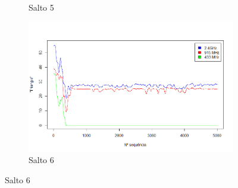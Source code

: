 \documentclass[
	12pt,				%
	openright,			%
	oneside,
	a4paper,			%
	english,			%
	french,				%
	spanish,			%
	brazil				%
	]{abntex2}
\begin{document}
\begin{figure}[htb]
\begin{subfigure}{.5\textwidth}
		\captionsetup{width=.9\textwidth}
		\caption{Salto 5}
		\label{trng_no_opt_s5}
	\end{subfigure}%
	\begin{subfigure}{.5\textwidth}
		\centering
		\includegraphics[width=.98\linewidth]{TRNG_Salto6}
		\captionsetup{width=.9\textwidth}
		\caption{Salto 6}
		\label{trng_no_opt_s6}
	\end{subfigure}
\end{figure}
\end{document}
